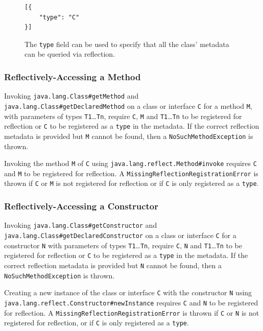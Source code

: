 \begin{figure}[ht]
    \centering
\begin{lstlisting}
[{
    "type": "C"
}]    
\end{lstlisting}
    \caption{The \texttt{type} field can be used to specify that all the class' metadata can be queried via reflection.}
    \label{fig:reflect_config_type}
\end{figure}

\subsubsection{Reflectively-Accessing a Method}
Invoking \texttt{java.lang.Class\#getMethod} and \texttt{java.lang.Class\#getDeclaredMethod} on a class or interface \verb|C| for a method \verb|M|, with parameters of types \verb|T1|\ldots\verb|Tn|, require \verb|C|, \verb|M| and \verb|T1|\ldots\verb|Tn| to be registered for reflection or \verb|C| to be registered as a \texttt{type} in the metadata. If the correct reflection metadata is provided but \verb|M| cannot be found, then a \texttt{NoSuchMethodException} is thrown. 

Invoking the method \verb|M| of \verb|C| using \texttt{java.lang.reflect.Method\#invoke} requires \verb|C| and \verb|M| to be registered for reflection. A \texttt{MissingReflectionRegistrationError} is thrown if \verb|C| or \verb|M| is not registered for reflection or if \verb|C| is only registered as a \texttt{type}.

\subsubsection{Reflectively-Accessing a Constructor}
Invoking \texttt{java.lang.Class\#getConstructor} and \texttt{java.lang.Class\#getDeclaredConstructor} on a class or interface \verb|C| for a constructor \verb|N| with parameters of types \verb|T1|\ldots\verb|Tn|, require \verb|C|, \verb|N| and \verb|T1|\ldots\verb|Tn| to be registered for reflection or \verb|C| to be registered as a \texttt{type} in the metadata. If the correct reflection metadata is provided but \verb|N| cannot be found, then a \texttt{NoSuchMethodException} is thrown.

Creating a new instance of the class or interface \verb|C| with the constructor \verb|N| using \texttt{java.lang.reflect.Constructor\#newInstance} requires \verb|C| and \verb|N| to be registered for reflection. A \texttt{MissingReflectionRegistrationError} is thrown if \verb|C| or \verb|N| is not registered for reflection, or if \verb|C| is only registered as a \texttt{type}.

